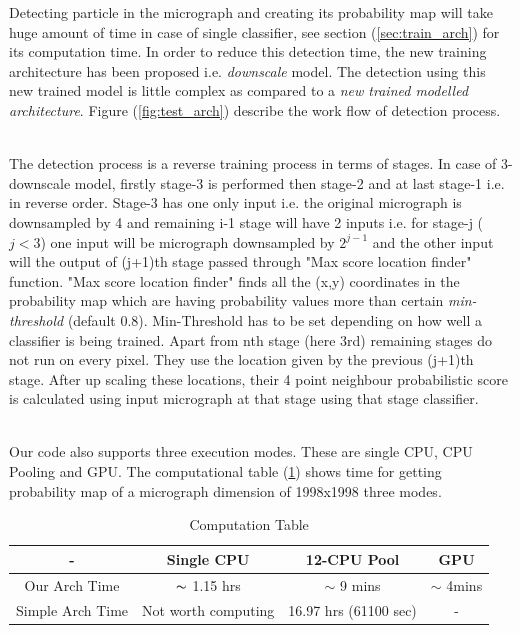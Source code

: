 \documentclass{report}
\begin{document}
Detecting particle in the micrograph and creating its probability map will take huge amount of time in case of single classifier, see section (\ref{sec:train_arch}) for its computation time. In order to reduce this detection time, the new training architecture has been proposed i.e. \textit{downscale} model. The detection using this new trained model is little complex as compared to a  \textit{new trained modelled architecture}. Figure (\ref{fig:test_arch}) describe the work flow of detection process.


\noindent\\
The detection process is a reverse training process in terms of stages. In case of 3-downscale model, firstly stage-3 is performed then stage-2 and at last stage-1 i.e. in reverse order. Stage-3 has one only input i.e. the original micrograph is downsampled by 4 and remaining i-1 stage will have 2 inputs i.e. for stage-j ($j<3$) one input will be micrograph downsampled by $2^{j-1}$ and the other input will the output of (j+1)th stage passed through "Max score location finder" function. "Max score location finder" finds all the (x,y) coordinates in the probability map which are having probability values more than certain \textit{min-threshold} (default 0.8). Min-Threshold has to be set depending on how well a classifier is being trained.  Apart from nth stage (here 3rd) remaining stages do not run on every pixel. They use the location given by the previous (j+1)th stage. After up scaling these locations, their 4 point neighbour probabilistic score is calculated using input micrograph at that stage using that stage classifier. 

\noindent\\
Our code also supports three execution modes. These are single CPU, CPU Pooling and GPU. The computational table (\ref{tbl:computation_tbl}) shows time for getting probability map of a micrograph dimension of 1998x1998 three modes.

\begin{center}
\begin{table}[H]
    \begin{tabular}{||c|c|c|c||} 
        \hline \hline
      -     & Single CPU & 12-CPU Pool & GPU \\ [0.5ex] 
        \hline\hline
        Our Arch Time & $\thicksim$ 1.15 hrs & $\sim$ 9 mins & $\sim$ 4mins \\ \hline
        Simple Arch Time & Not worth computing&  16.97 hrs (61100 sec)  & - \\ 
        \hline
        \hline
    \end{tabular}
    \caption{Computation Table}
    \label{tbl:computation_tbl}
\end{table}
\end{center}
\end{document}
